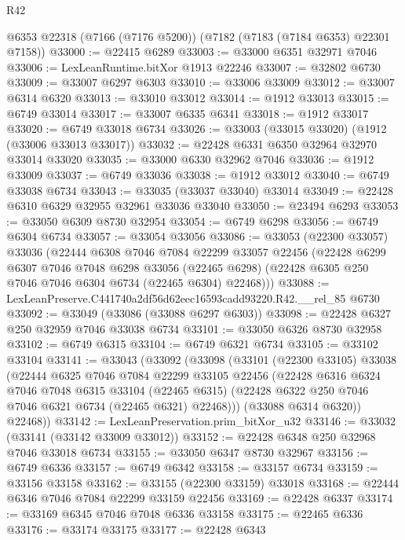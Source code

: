 \begin{lexlean}{R42}
\begin{coremodule}
{    @6353
    @22318
    (@7166 (@7176 @5200))
    (@7182 (@7183 (@7184 @6353) @22301 @7158))
@33000 := @22415 @6289
@33003 := @33000 @6351 @32971 @7046
@33006 := LexLeanRuntime.bitXor @1913 @22246
@33007 := @32802 @6730
@33009 := @33007 @6297 @6303
@33010 := @33006 @33009
@33012 := @33007 @6314 @6320
@33013 := @33010 @33012
@33014 := @1912 @33013
@33015 := @6749 @33014
@33017 := @33007 @6335 @6341
@33018 := @1912 @33017
@33020 := @6749 @33018 @6734
@33026 := @33003 (@33015 @33020) (@1912 (@33006 @33013 @33017))
@33032 := @22428 @6331 @6350 @32964 @32970 @33014 @33020
@33035 := @33000 @6330 @32962 @7046
@33036 := @1912 @33009
@33037 := @6749 @33036
@33038 := @1912 @33012
@33040 := @6749 @33038 @6734
@33043 := @33035 (@33037 @33040) @33014
@33049 := @22428 @6310 @6329 @32955 @32961 @33036 @33040
@33050 := @23494 @6293
@33053 := @33050 @6309 @8730 @32954
@33054 := @6749 @6298
@33056 := @6749 @6304 @6734
@33057 := @33054 @33056
@33086 := @33053
    (@22300 @33057)
    @33036
    (@22444
      @6308
      @7046
      @7084
      @22299
      @33057
      @22456
      (@22428
        @6299
        @6307
        @7046
        @7048
        @6298
        @33056
        (@22465 @6298)
        (@22428 @6305 @250 @7046 @7046 @6304 @6734 (@22465 @6304) @22468)))
@33088 := LexLeanPreserve.C441740a2df56d62eec16593cadd93220.R42.__rel_85 @6730
@33092 := @33049 (@33086 (@33088 @6297 @6303))
@33098 := @22428 @6327 @250 @32959 @7046 @33038 @6734
@33101 := @33050 @6326 @8730 @32958
@33102 := @6749 @6315
@33104 := @6749 @6321 @6734
@33105 := @33102 @33104
@33141 := @33043
    (@33092
      (@33098
        (@33101
          (@22300 @33105)
          @33038
          (@22444
            @6325
            @7046
            @7084
            @22299
            @33105
            @22456
            (@22428
              @6316
              @6324
              @7046
              @7048
              @6315
              @33104
              (@22465 @6315)
              (@22428 @6322 @250 @7046 @7046 @6321 @6734 (@22465 @6321) @22468)))
          (@33088 @6314 @6320))
        @22468))
@33142 := LexLeanPreservation.prim_bitXor_u32
@33146 := @33032 (@33141 (@33142 @33009 @33012))
@33152 := @22428 @6348 @250 @32968 @7046 @33018 @6734
@33155 := @33050 @6347 @8730 @32967
@33156 := @6749 @6336
@33157 := @6749 @6342
@33158 := @33157 @6734
@33159 := @33156 @33158
@33162 := @33155 (@22300 @33159) @33018
@33168 := @22444 @6346 @7046 @7084 @22299 @33159 @22456
@33169 := @22428 @6337
@33174 := @33169 @6345 @7046 @7048 @6336 @33158
@33175 := @22465 @6336
@33176 := @33174 @33175
@33177 := @22428 @6343
}
\end{coremodule}
\end{lexlean}
